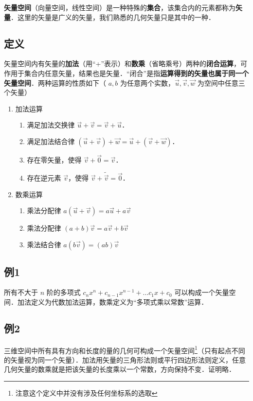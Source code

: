 
\textbf{矢量空间}（向量空间，线性空间）是一种特殊的\textbf{集合}，该集合内的元素都称为\textbf{矢量}．这里的矢量是广义的矢量，我们熟悉的几何矢量只是其中的一种．

\subsection{定义}
矢量空间内有矢量的\textbf{加法}（用“+”表示）和\textbf{数乘}（省略乘号）两种的\textbf{闭合运算}，可作用于集合内任意矢量，结果也是矢量．“闭合”是指\textbf{运算得到的矢量也属于同一个矢量空间}．两种运算的性质如下（ $a,b$ 为任意两个实数，$\vec u,\vec v,\vec w$ 为空间中任意三个矢量）
\begin{enumerate}
\item 加法运算
\begin{enumerate}
\item 满足加法交换律 $\vec u + \vec v = \vec v + \vec u$．
\item 满足加法结合律 $(\vec u + \vec v) + \vec w = \vec u + (\vec v + \vec w)$．
\item 存在零矢量，使得 $\vec v + \vec 0 = \vec v$．
\item 存在逆元素 $\vec v$，使得 $\vec v + \tilde{\vec v} = \vec 0$．
\end{enumerate}

\item 数乘运算
\begin{enumerate}
\item 乘法分配律 $a(\vec u + \vec v) = a\vec u + a\vec v$ 
\item 乘法分配律 $(a + b)\vec v = a\vec v + b\vec v$
\item 乘法结合律 $a (b \vec v) = (ab) \vec v$
\end{enumerate}
\end{enumerate}

\subsection{例1}
所有不大于 $n$ 阶的多项式 ${c_n}{x^n}+{c_{n - 1}}{x^{n - 1}}+\dots{c_1}x　+{c_0}$ 可以构成一个矢量空间．加法定义为代数加法运算，数乘定义为“多项式乘以常数”运算． 

\subsection{例2}
三维空间中所有具有方向和长度的量的几何可构成一个矢量空间\footnote{注意这个定义中并没有涉及任何坐标系的选取}（只有起点不同的矢量视为同一个矢量）．加法用矢量的三角形法则或平行四边形法则定义，任意几何矢量的数乘就是把该矢量的长度乘以一个常数，方向保持不变．证明略．



